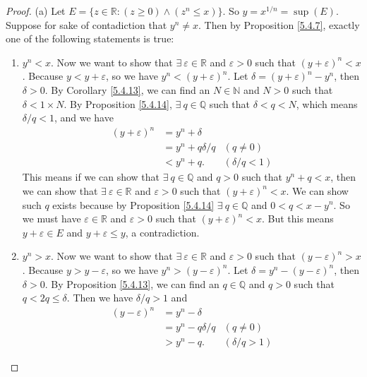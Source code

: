 \begin{proof}{(a)}
Let \(E = \{z \in \mathds{R} : (z \geq 0) \land (z^n \leq x)\}\).
So \(y = x^{1 / n} = \sup(E)\).
Suppose for sake of contadiction that \(y^n \neq x\).
Then by Proposition \ref{5.4.7}, exactly one of the following statements is true:
\begin{enumerate}[label=(\Roman*)]
    \item \(y^n < x\).
    Now we want to show that \(\exists\ \varepsilon \in \mathds{R}\) and \(\varepsilon > 0\) such that \((y + \varepsilon)^n < x\).
    Because \(y < y + \varepsilon\), so we have \(y^n < (y + \varepsilon)^n\).
    Let \(\delta = (y + \varepsilon)^n - y^n\), then \(\delta > 0\).
    By Corollary \ref{5.4.13}, we can find an \(N \in \mathds{N}\) and \(N > 0\) such that \(\delta < 1 \times N\).
    By Proposition \ref{5.4.14}, \(\exists\ q \in \mathds{Q}\) such that \(\delta < q < N\), which means \(\delta / q < 1\), and we have
    \begin{align*}
        (y + \varepsilon)^n &= y^n + \delta \\
        &= y^n + q \delta / q & (q \neq 0) \\
        &< y^n + q. & (\delta / q < 1)
    \end{align*}
    This means if we can show that \(\exists\ q \in \mathds{Q}\) and \(q > 0\) such that \(y^n + q < x\), then we can show that \(\exists\ \varepsilon \in \mathds{R}\) and \(\varepsilon > 0\) such that \((y + \varepsilon)^n < x\).
    We can show such \(q\) exists because by Proposition \ref{5.4.14} \(\exists\ q \in \mathds{Q}\) and \(0 < q < x - y^n\).
    So we must have \(\varepsilon \in \mathds{R}\) and \(\varepsilon > 0\) such that \((y + \varepsilon)^n < x\).
    But this means \(y + \varepsilon \in E\) and \(y + \varepsilon \leq y\), a contradiction.
    \item \(y^n > x\).
    Now we want to show that \(\exists\ \varepsilon \in \mathds{R}\) and \(\varepsilon > 0\) such that \((y - \varepsilon)^n > x\).
    Because \(y > y - \varepsilon\), so we have \(y^n > (y - \varepsilon)^n\).
    Let \(\delta = y^n - (y - \varepsilon)^n\), then \(\delta > 0\).
    By Proposition \ref{5.4.13}, we can find an \(q \in \mathds{Q}\) and \(q > 0\) such that \(q < 2q \leq \delta\).
    Then we have \(\delta / q > 1\) and
    \begin{align*}
        (y - \varepsilon)^n &= y^n - \delta \\
        &= y^n - q \delta / q & (q \neq 0) \\
        &> y^n - q. & (\delta / q > 1)

\end{align*}
\end{enumerate}
\end{proof}
